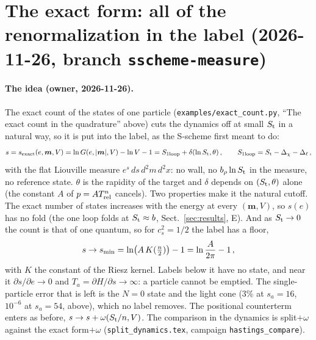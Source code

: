 \documentclass[11pt,aps,preprint,nofootinbib,superscriptaddress,tightenlines]{revtex4-2}
\def\st{\begin{equation}}
\def\stp{\end{equation}}
\def\Sect#1{Sect.~\ref{#1}}
\let\oldparagraph\paragraph
\renewcommand{\paragraph}{\par\bigskip\oldparagraph}
\begin{document}
\section{The exact form: all of the renormalization in the label (2026-11-26, branch \texttt{sscheme-measure})}
\label{sec:exact}

\paragraph{The idea (owner, 2026-11-26).}  The exact count of the states of one particle (\nolinkurl{examples/exact_count.py}, ``The exact count in
the quadrature'' above) cuts the dynamics off at small $S_{\rm t}$ in a natural way, so it is put into the label, as the S-scheme first meant to do:
\st
s=s_{\rm exact}(e,\bm m,V)=\ln G(e,|\bm m|,V)-\ln V-1=S_{\rm 1loop}+\delta(\ln S_{\rm t},\theta)\,,\qquad S_{\rm 1loop}=S_{\rm t}-\Delta_\chi-\Delta_\ell\,,
\label{sexact}
\stp
with the flat Liouville measure $e^s\,ds\,d^2m\,d^2x$: no wall, no $b_\rho\ln S_{\rm t}$ in the measure, no reference state.  $\theta$ is the rapidity
of the target and $\delta$ depends on $(S_{\rm t},\theta)$ alone (the constant $A$ of $p=AT_{\rm rel}^n$ cancels).  Two properties make it the natural
cutoff.  The exact number of states increases with the energy at every $(\bm m,V)$, so $s(e)$ has no fold (the one loop folds at $S_{\rm t}\approx b$,
\Sect{sec:results}, E).  And as $S_{\rm t}\to0$ the count is that of one quantum, so for $c_s^2=1/2$ the label has a floor,
\st
s\to s_{\rm min}=\ln\!\big(A\,K(\tfrac n2)\big)-1=\ln\frac{A}{2\pi}-1\,,
\stp
with $K$ the constant of the Riesz kernel.  Labels below it have no state, and near it $\partial s/\partial e\to0$ and $T_a=\partial H/\partial s\to\infty$:
a particle cannot be emptied.  The single-particle error that is left is the $N=0$ state and the light cone (3\% at $s_a=16$, $10^{-6}$ at $s_a=54$,
above), which no label removes.  The positional counterterm enters as before, $s\to s+\omega(S_{\rm t}/n,V)$.  The comparison in the dynamics is
split$+\omega$ against the exact form$+\omega$ (\nolinkurl{split_dynamics.tex}, campaign \texttt{hastings\_compare}).
\end{document}

